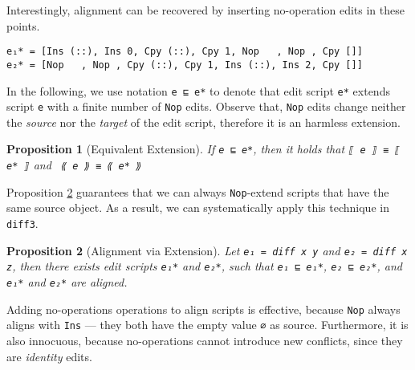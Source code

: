 \documentclass{sigplanconf}
\theoremstyle{plain}
\newtheorem{prop}{Proposition}
\begin{document}
Interestingly, alignment can be recovered by inserting no-operation
edits in these points.
\begin{verbatim}
e₁* = [Ins (::), Ins 0, Cpy (::), Cpy 1, Nop   , Nop , Cpy []]
e₂* = [Nop   , Nop , Cpy (::), Cpy 1, Ins (::), Ins 2, Cpy []] 
\end{verbatim}

In the following, we use notation \texttt{e ⊑ e*} to denote that edit
script \texttt{e*} extends script \texttt{e} with a finite number of
\texttt{Nop} edits.
%
Observe that, \texttt{Nop} edits change neither the \emph{source} nor the
\emph{target} of the edit script, therefore it is an harmless
extension.
\begin{prop}[Equivalent Extension]
  If \texttt{e ⊑ e*}, then it holds that \texttt{⟦ e ⟧ ≡ ⟦ e* ⟧} and
  \texttt{ ⟪ e ⟫ ≡ ⟪ e* ⟫}
\end{prop}

Proposition \ref{prop:align-ext} guarantees that we can always
\texttt{Nop}-extend scripts that have the same source object.
%
As a result, we can systematically apply this technique in
\texttt{diff3}.
%
\begin{prop}[Alignment via Extension]
\label{prop:align-ext}
  Let \texttt{e₁ = diff x y} and \texttt{e₂ = diff x z}, then there
  exists edit scripts \texttt{e₁*} and \texttt{e₂*}, such that
  \texttt{e₁ ⊑ e₁*}, \texttt{e₂ ⊑ e₂*}, and \texttt{e₁*} and
  \texttt{e₂*} are aligned.
\end{prop}
Adding no-operations operations to align scripts is effective, because
\texttt{Nop} always aligns with \texttt{Ins} --- they both have the
empty value \texttt{∅} as source.
%
Furthermore, it is also innocuous, because no-operations cannot
introduce new conflicts, since they are \emph{identity} edits.



\end{document}

